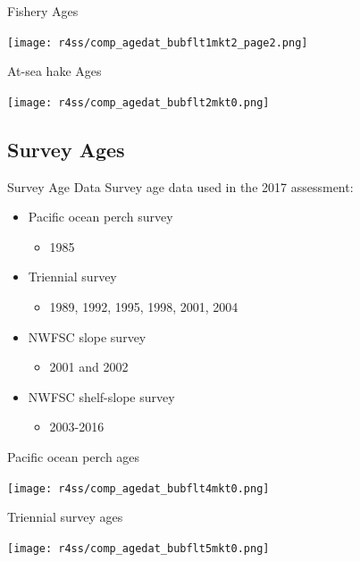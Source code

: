 \documentclass[pdf]{beamer}\usepackage[]{graphicx}\usepackage[]{color}
\begin{document}
\begin{frame}{Fishery Ages}
  \begin{center}
    \texttt{[image: r4ss/comp\_agedat\_bubflt1mkt2\_page2.png]}
  \end{center}
\end{frame}

\begin{frame}{At-sea hake Ages}
  \begin{center}
    \texttt{[image: r4ss/comp\_agedat\_bubflt2mkt0.png]}
  \end{center}
\end{frame}

\subsection{Survey Ages}
\begin{frame}{Survey Age Data}
  Survey age data used in the 2017 assessment:
  \begin{itemize}
    \item Pacific ocean perch survey
      \begin{itemize}
        \item 1985
      \end{itemize}
    \item Triennial survey
      \begin{itemize}
        \item 1989, 1992, 1995, 1998, 2001, 2004
      \end{itemize}
    \item NWFSC slope survey
      \begin{itemize}
        \item 2001 and 2002
      \end{itemize}
    \item NWFSC shelf-slope survey
      \begin{itemize}
        \item 2003-2016
      \end{itemize}
  \end{itemize}
\end{frame}

\begin{frame}{Pacific ocean perch ages}
  \begin{center}
    \texttt{[image: r4ss/comp\_agedat\_bubflt4mkt0.png]}
  \end{center}
\end{frame}

\begin{frame}{Triennial survey ages}
  \begin{center}
    \texttt{[image: r4ss/comp\_agedat\_bubflt5mkt0.png]}
  \end{center}
\end{frame}
\end{document}
